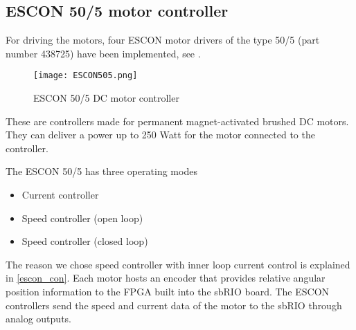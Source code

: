\subsection{ESCON 50/5 motor controller}\label{sec:motor_control}
For driving the motors, four ESCON motor drivers of the type 50/5 (part number 438725) have been implemented, see . 

\begin{figure}[H]
	\centering
		\centering
		\texttt{[image: ESCON505.png]}
		\caption{ESCON 50/5 DC motor controller\cite{ESCON_motor_controller}}
		\label{fig:ESCON505}
\end{figure}

These are controllers made for permanent magnet-activated brushed DC motors. They can deliver a power up to 250 Watt for the motor connected to the controller. 

The ESCON 50/5 has three operating modes

\begin{itemize}
\item Current controller
\item Speed controller (open loop)
\item Speed controller (closed loop)
\end{itemize}

The reason we chose speed controller with inner loop current control is explained in \ref{escon_con}.
Each motor hosts an encoder that provides relative angular position information to the FPGA built into the sbRIO board.
The ESCON controllers send the speed and current data of the motor to the sbRIO through analog outputs. 
